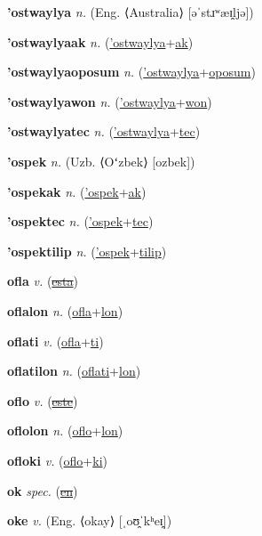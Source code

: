 \textbf{\hypertarget{'ostwaylya}{'ostwaylya}} \textit{n.} (Eng. ⟨Australia⟩ [əˈstɹʷæɪ̯ljə])


\textbf{\hypertarget{'ostwaylyaak}{'ostwaylyaak}} \textit{n.} (\hyperlink{'ostwaylya}{'ostwaylya}+\allowbreak \hyperlink{ak}{ak})


\textbf{\hypertarget{'ostwaylyaoposum}{'ostwaylyaoposum}} \textit{n.} (\hyperlink{'ostwaylya}{'ostwaylya}+\allowbreak \hyperlink{oposum}{oposum})


\textbf{\hypertarget{'ostwaylyawon}{'ostwaylyawon}} \textit{n.} (\hyperlink{'ostwaylya}{'ostwaylya}+\allowbreak \hyperlink{won}{won})


\textbf{\hypertarget{'ostwaylyatec}{'ostwaylyatec}} \textit{n.} (\hyperlink{'ostwaylya}{'ostwaylya}+\allowbreak \hyperlink{tec}{tec})


\textbf{\hypertarget{'ospek}{'ospek}} \textit{n.} (Uzb. ⟨Oʻzbek⟩ [ozbek])


\textbf{\hypertarget{'ospekak}{'ospekak}} \textit{n.} (\hyperlink{'ospek}{'ospek}+\allowbreak \hyperlink{ak}{ak})


\textbf{\hypertarget{'ospektec}{'ospektec}} \textit{n.} (\hyperlink{'ospek}{'ospek}+\allowbreak \hyperlink{tec}{tec})


\textbf{\hypertarget{'ospektilip}{'ospektilip}} \textit{n.} (\hyperlink{'ospek}{'ospek}+\allowbreak \hyperlink{tilip}{tilip})


\textbf{\hypertarget{ofla}{ofla}} \textit{v.} (\hyperlink{esta}{\sout{esta}})


\textbf{\hypertarget{oflalon}{oflalon}} \textit{n.} (\hyperlink{ofla}{ofla}+\allowbreak \hyperlink{lon}{lon})


\textbf{\hypertarget{oflati}{oflati}} \textit{v.} (\hyperlink{ofla}{ofla}+\allowbreak \hyperlink{ti}{ti})


\textbf{\hypertarget{oflatilon}{oflatilon}} \textit{n.} (\hyperlink{oflati}{oflati}+\allowbreak \hyperlink{lon}{lon})


\textbf{\hypertarget{oflo}{oflo}} \textit{v.} (\hyperlink{este}{\sout{este}})


\textbf{\hypertarget{oflolon}{oflolon}} \textit{n.} (\hyperlink{oflo}{oflo}+\allowbreak \hyperlink{lon}{lon})


\textbf{\hypertarget{ofloki}{ofloki}} \textit{v.} (\hyperlink{oflo}{oflo}+\allowbreak \hyperlink{ki}{ki})


\textbf{\hypertarget{ok}{ok}} \textit{spec.} (\hyperlink{en}{\sout{en}})


\textbf{\hypertarget{oke}{oke}} \textit{v.} (Eng. ⟨okay⟩ [ˌoʊ̯ˈkʰeɪ̯])


